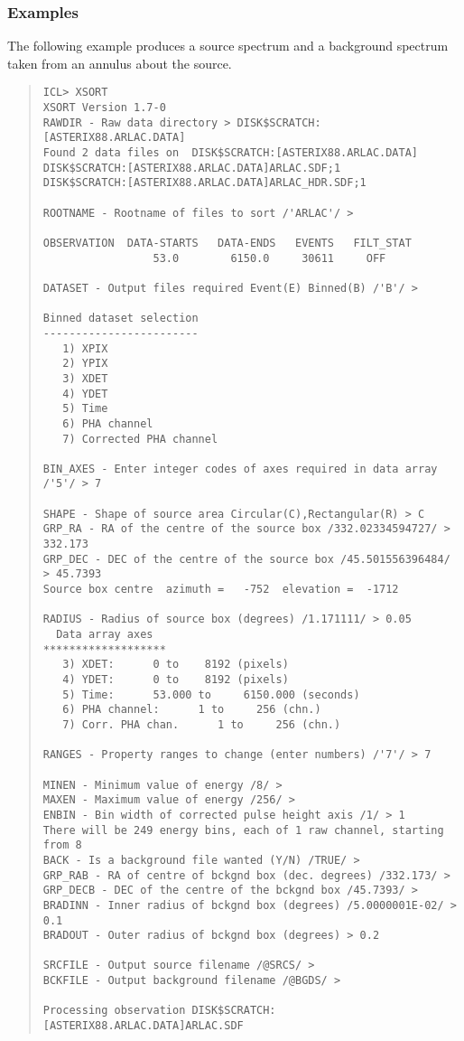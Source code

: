 \documentclass{book}
\renewcommand{\_}{{\tt\char'137}}     %
\begin{document}
\subsubsection{Examples}
The following example produces a source spectrum and a background
spectrum taken from an annulus about the source.
\begin{quote}\begin{verbatim}
ICL> XSORT
XSORT Version 1.7-0
RAWDIR - Raw data directory > DISK$SCRATCH:[ASTERIX88.ARLAC.DATA]
Found 2 data files on  DISK$SCRATCH:[ASTERIX88.ARLAC.DATA]
DISK$SCRATCH:[ASTERIX88.ARLAC.DATA]ARLAC.SDF;1
DISK$SCRATCH:[ASTERIX88.ARLAC.DATA]ARLAC_HDR.SDF;1

ROOTNAME - Rootname of files to sort /'ARLAC'/ >

OBSERVATION  DATA-STARTS   DATA-ENDS   EVENTS   FILT_STAT
                 53.0        6150.0     30611     OFF

DATASET - Output files required Event(E) Binned(B) /'B'/ >

Binned dataset selection
------------------------
   1) XPIX
   2) YPIX
   3) XDET
   4) YDET
   5) Time
   6) PHA channel
   7) Corrected PHA channel

BIN_AXES - Enter integer codes of axes required in data array /'5'/ > 7

SHAPE - Shape of source area Circular(C),Rectangular(R) > C
GRP_RA - RA of the centre of the source box /332.02334594727/ > 332.173
GRP_DEC - DEC of the centre of the source box /45.501556396484/ > 45.7393
Source box centre  azimuth =   -752  elevation =  -1712

RADIUS - Radius of source box (degrees) /1.171111/ > 0.05
  Data array axes
*******************
   3) XDET:      0 to    8192 (pixels)
   4) YDET:      0 to    8192 (pixels)
   5) Time:      53.000 to     6150.000 (seconds)
   6) PHA channel:      1 to     256 (chn.)
   7) Corr. PHA chan.      1 to     256 (chn.)

RANGES - Property ranges to change (enter numbers) /'7'/ > 7

MINEN - Minimum value of energy /8/ >
MAXEN - Maximum value of energy /256/ >
ENBIN - Bin width of corrected pulse height axis /1/ > 1
There will be 249 energy bins, each of 1 raw channel, starting from 8
BACK - Is a background file wanted (Y/N) /TRUE/ >
GRP_RAB - RA of centre of bckgnd box (dec. degrees) /332.173/ >
GRP_DECB - DEC of the centre of the bckgnd box /45.7393/ >
BRADINN - Inner radius of bckgnd box (degrees) /5.0000001E-02/ > 0.1
BRADOUT - Outer radius of bckgnd box (degrees) > 0.2

SRCFILE - Output source filename /@SRCS/ >
BCKFILE - Output background filename /@BGDS/ >

Processing observation DISK$SCRATCH:[ASTERIX88.ARLAC.DATA]ARLAC.SDF
\end{verbatim}\end{quote}
\end{document}
